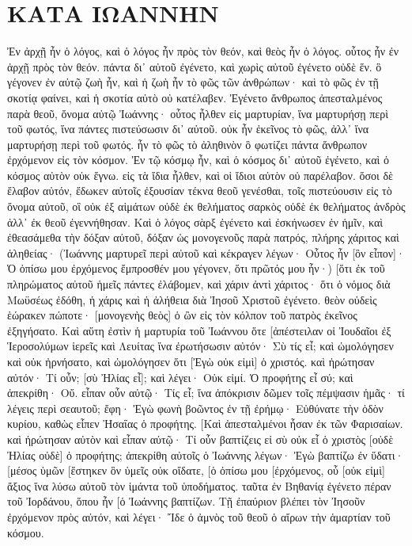 \section{ΚΑΤΑ ΙΩΑΝΝΗΝ}
Ἐν ἀρχῇ ἦν ὁ λόγος, καὶ ὁ λόγος ἦν πρὸς τὸν θεόν, καὶ θεὸς ἦν ὁ λόγος. 
οὗτος ἦν ἐν ἀρχῇ πρὸς τὸν θεόν. 
πάντα δι᾽ αὐτοῦ ἐγένετο, καὶ χωρὶς αὐτοῦ ἐγένετο οὐδὲ ἕν. ὃ γέγονεν 
ἐν αὐτῷ ζωὴ ἦν, καὶ ἡ ζωὴ ἦν τὸ φῶς τῶν ἀνθρώπων· 
καὶ τὸ φῶς ἐν τῇ σκοτίᾳ φαίνει, καὶ ἡ σκοτία αὐτὸ οὐ κατέλαβεν. 
Ἐγένετο ἄνθρωπος ἀπεσταλμένος παρὰ θεοῦ, ὄνομα αὐτῷ Ἰωάννης· 
οὗτος ἦλθεν εἰς μαρτυρίαν, ἵνα μαρτυρήσῃ περὶ τοῦ φωτός, ἵνα πάντες πιστεύσωσιν δι᾽ αὐτοῦ. 
οὐκ ἦν ἐκεῖνος τὸ φῶς, ἀλλ᾽ ἵνα μαρτυρήσῃ περὶ τοῦ φωτός. 
ἦν τὸ φῶς τὸ ἀληθινὸν ὃ φωτίζει πάντα ἄνθρωπον ἐρχόμενον εἰς τὸν κόσμον. 
Ἐν τῷ κόσμῳ ἦν, καὶ ὁ κόσμος δι᾽ αὐτοῦ ἐγένετο, καὶ ὁ κόσμος αὐτὸν οὐκ ἔγνω. 
εἰς τὰ ἴδια ἦλθεν, καὶ οἱ ἴδιοι αὐτὸν οὐ παρέλαβον. 
ὅσοι δὲ ἔλαβον αὐτόν, ἔδωκεν αὐτοῖς ἐξουσίαν τέκνα θεοῦ γενέσθαι, τοῖς πιστεύουσιν εἰς τὸ ὄνομα αὐτοῦ, 
οἳ οὐκ ἐξ αἱμάτων οὐδὲ ἐκ θελήματος σαρκὸς οὐδὲ ἐκ θελήματος ἀνδρὸς ἀλλ᾽ ἐκ θεοῦ ἐγεννήθησαν. 
Καὶ ὁ λόγος σὰρξ ἐγένετο καὶ ἐσκήνωσεν ἐν ἡμῖν, καὶ ἐθεασάμεθα τὴν δόξαν αὐτοῦ, δόξαν ὡς μονογενοῦς παρὰ πατρός, πλήρης χάριτος καὶ ἀληθείας· 
(Ἰωάννης μαρτυρεῖ περὶ αὐτοῦ καὶ κέκραγεν λέγων· Οὗτος ἦν [ὃν εἶπον]· Ὁ ὀπίσω μου ἐρχόμενος ἔμπροσθέν μου γέγονεν, ὅτι πρῶτός μου ἦν·) 
[ὅτι ἐκ τοῦ πληρώματος αὐτοῦ ἡμεῖς πάντες ἐλάβομεν, καὶ χάριν ἀντὶ χάριτος· 
ὅτι ὁ νόμος διὰ Μωϋσέως ἐδόθη, ἡ χάρις καὶ ἡ ἀλήθεια διὰ Ἰησοῦ Χριστοῦ ἐγένετο. 
θεὸν οὐδεὶς ἑώρακεν πώποτε· [μονογενὴς θεὸς] ὁ ὢν εἰς τὸν κόλπον τοῦ πατρὸς ἐκεῖνος ἐξηγήσατο. 
Καὶ αὕτη ἐστὶν ἡ μαρτυρία τοῦ Ἰωάννου ὅτε [ἀπέστειλαν οἱ Ἰουδαῖοι ἐξ Ἱεροσολύμων ἱερεῖς καὶ Λευίτας ἵνα ἐρωτήσωσιν αὐτόν· Σὺ τίς εἶ; 
καὶ ὡμολόγησεν καὶ οὐκ ἠρνήσατο, καὶ ὡμολόγησεν ὅτι [Ἐγὼ οὐκ εἰμὶ] ὁ χριστός. 
καὶ ἠρώτησαν αὐτόν· Τί οὖν; [σὺ Ἠλίας εἶ]; καὶ λέγει· Οὐκ εἰμί. Ὁ προφήτης εἶ σύ; καὶ ἀπεκρίθη· Οὔ. 
εἶπαν οὖν αὐτῷ· Τίς εἶ; ἵνα ἀπόκρισιν δῶμεν τοῖς πέμψασιν ἡμᾶς· τί λέγεις περὶ σεαυτοῦ; 
ἔφη· Ἐγὼ φωνὴ βοῶντος ἐν τῇ ἐρήμῳ· Εὐθύνατε τὴν ὁδὸν κυρίου, καθὼς εἶπεν Ἠσαΐας ὁ προφήτης. 
[Καὶ ἀπεσταλμένοι ἦσαν ἐκ τῶν Φαρισαίων. 
καὶ ἠρώτησαν αὐτὸν καὶ εἶπαν αὐτῷ· Τί οὖν βαπτίζεις εἰ σὺ οὐκ εἶ ὁ χριστὸς [οὐδὲ Ἠλίας οὐδὲ] ὁ προφήτης; 
ἀπεκρίθη αὐτοῖς ὁ Ἰωάννης λέγων· Ἐγὼ βαπτίζω ἐν ὕδατι· [μέσος ὑμῶν [ἕστηκεν ὃν ὑμεῖς οὐκ οἴδατε, 
[ὁ ὀπίσω μου [ἐρχόμενος, οὗ [οὐκ εἰμὶ] ἄξιος ἵνα λύσω αὐτοῦ τὸν ἱμάντα τοῦ ὑποδήματος. 
ταῦτα ἐν Βηθανίᾳ ἐγένετο πέραν τοῦ Ἰορδάνου, ὅπου ἦν [ὁ Ἰωάννης βαπτίζων. 
Τῇ ἐπαύριον βλέπει τὸν Ἰησοῦν ἐρχόμενον πρὸς αὐτόν, καὶ λέγει· Ἴδε ὁ ἀμνὸς τοῦ θεοῦ ὁ αἴρων τὴν ἁμαρτίαν τοῦ κόσμου. 
